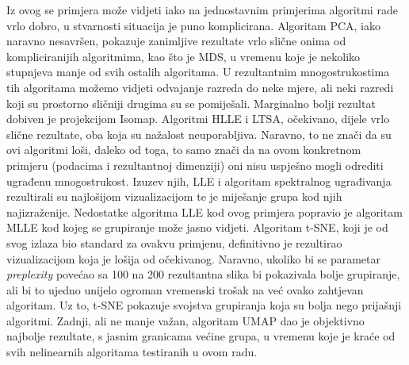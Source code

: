\documentclass[times, utf8, diplomski]{fer}
\begin{document}
Iz ovog se primjera može vidjeti iako na jednostavnim primjerima algoritmi rade vrlo dobro, u stvarnosti situacija je puno komplicirana. Algoritam PCA, iako naravno nesavršen, pokazuje zanimljive rezultate vrlo slične onima od kompliciranijih algoritmima, kao što je MDS, u vremenu koje je nekoliko stupnjeva manje od svih ostalih algoritama. U rezultantnim mnogostrukostima tih algoritama možemo vidjeti odvajanje razreda do neke mjere, ali neki razredi koji su prostorno sličniji drugima su se pomiješali. Marginalno bolji rezultat dobiven je projekcijom Isomap. Algoritmi HLLE i LTSA, očekivano, dijele vrlo slične rezultate, oba koja su nažalost neuporabljiva. Naravno, to ne znači da su ovi algoritmi loši, daleko od toga, to samo znači da na ovom konkretnom primjeru (podacima i rezultantnoj dimenziji) oni nisu uspješno mogli odrediti ugrađenu mnogostrukost. Izuzev njih, LLE i algoritam spektralnog ugrađivanja rezultirali su najlošijom vizualizacijom te je miješanje grupa kod njih najizraženije. Nedostatke algoritma LLE kod ovog primjera popravio je algoritam MLLE kod kojeg se grupiranje može jasno vidjeti. Algoritam t-SNE, koji je od svog izlaza bio standard za ovakvu primjenu, definitivno je rezultirao vizualizacijom koja je lošija od očekivanog. Naravno, ukoliko bi se parametar \emph{preplexity} povećao sa 100 na 200 rezultantna slika bi pokazivala bolje grupiranje, ali bi to ujedno unijelo ogroman vremenski trošak na već ovako zahtjevan algoritam. Uz to, t-SNE pokazuje svojstva grupiranja koja su bolja nego prijašnji algoritmi. Zadnji, ali ne manje važan, algoritam UMAP dao je objektivno najbolje rezultate, s jasnim granicama većine grupa, u vremenu koje je kraće od svih nelinearnih algoritama testiranih u ovom radu.

\bigskip
{}
\end{document}
